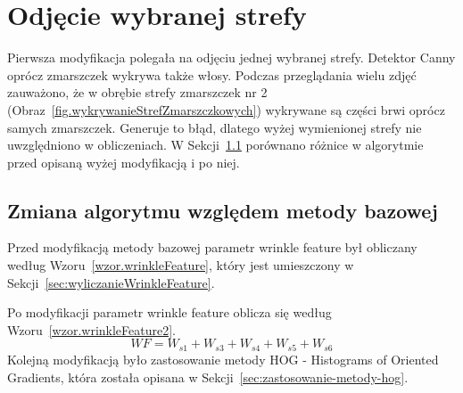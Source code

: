 \documentclass[a4paper,twoside,12pt]{book}
\begin{document}
    \section{Odjęcie wybranej strefy}\label{sec:odjęcie-wybranej-strefy}
    Pierwsza modyfikacja polegała na odjęciu jednej wybranej strefy. Detektor Canny oprócz zmarszczek
    wykrywa także włosy. Podczas przeglądania wielu zdjęć zauważono, że w obrębie
    strefy zmarszczek nr 2 (Obraz~\ref{fig.wykrywanieStrefZmarszczkowych}) wykrywane są części brwi oprócz samych
    zmarszczek. Generuje to błąd, dlatego wyżej wymienionej strefy nie uwzględniono w obliczeniach.
    W Sekcji~\ref{subsec:zmiana-algorytmu-względem-metody-bazowej} porównano różnice w algorytmie przed opisaną wyżej
    modyfikacją i po niej.

    \subsection{Zmiana algorytmu względem metody bazowej}\label{subsec:zmiana-algorytmu-względem-metody-bazowej}
    Przed modyfikacją metody bazowej parametr wrinkle feature był obliczany według Wzoru~\ref{wzor.wrinkleFeature},
    który jest umieszczony w Sekcji~\ref{sec:wyliczanieWrinkleFeature}.

    Po modyfikacji parametr wrinkle feature oblicza się według Wzoru~\ref{wzor.wrinkleFeature2}.
    \large
    \begin{equation}
        WF = W_{s1} + W_{s3} + W_{s4} + W_{s5} + W_{s6}
        \label{wzor.wrinkleFeature2}
    \end{equation}
    \normalsize
    Kolejną modyfikacją było zastosowanie metody HOG - Histograms of Oriented Gradients, która została opisana w Sekcji~\ref{sec:zastosowanie-metody-hog}.
\end{document}

